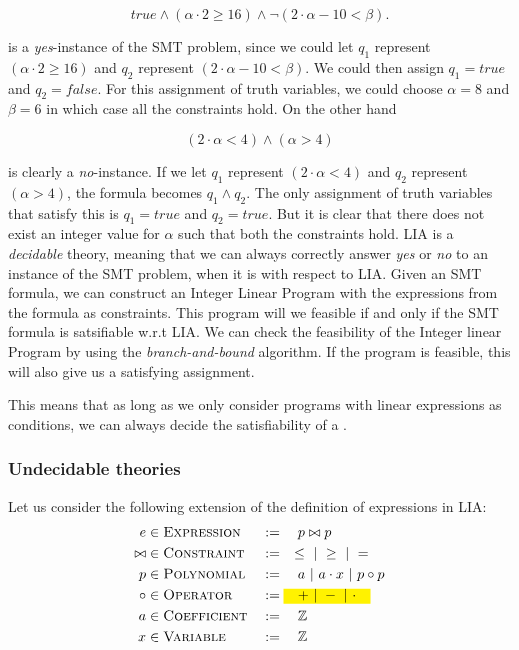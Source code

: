 	\begin{equation*}	
	true \land (\alpha \cdot 2 \geq 16) \land \neg (2\cdot \alpha - 10 < \beta).
	\end{equation*}

	is a \emph{yes}-instance of the SMT problem, since we could let $q_1$ represent $(\alpha \cdot 2 \geq 16)$ and $q_2$ represent $(2\cdot \alpha - 10 < \beta)$. We could then assign $q_1 = true$ and $q_2 = false$. For this assignment of truth variables, we could choose $\alpha = 8$ and $\beta = 6$ in which case all the constraints hold. On the other hand 
	
	\begin{equation*}
		(2\cdot \alpha < 4) \land (\alpha > 4)
	\end{equation*}
	
	is clearly a \emph{no}-instance. If we let $q_1$ represent $(2\cdot \alpha < 4)$ and $q_2$ represent $(\alpha > 4)$, the formula becomes $q_1\land q_2$. The only assignment of truth variables that satisfy this is $q_1 = true$ and $q_2 = true$. But it is clear that there does not exist an integer value for $\alpha$ such that both the constraints hold. LIA is a \emph{decidable} theory, meaning that we can always correctly answer \emph{yes} or \emph{no} to an instance of the SMT problem, when it is with respect to LIA. Given an SMT formula, we can construct an Integer Linear Program with the expressions from the formula as constraints. This program will we feasible if and only if the SMT formula is satsifiable w.r.t LIA. We can check the feasibility of the Integer linear Program by using the \emph{branch-and-bound} algorithm. If the program is feasible, this will also give us a satisfying assignment.
	
	This means that as long as we only consider programs with linear expressions as conditions, we can always decide the satisfiability of a \pc.
	
	\subsubsection{Undecidable theories}
	Let us consider the following extension of the definition of expressions in LIA:
	\begin{alignat*}{3}
		e & \in \textsc{Expression} && := \quad p \bowtie p\\
		\bowtie & \in \textsc{Constraint} && := \quad \leq \alt \geq \alt =\\
		p & \in \textsc{Polynomial} && := \quad a \alt a\cdot x \alt p \circ p\\
		\circ & \in \textsc{Operator} && := \text{\hl{$\quad + \alt - \alt \cdot \quad$}} \\
		a & \in \textsc{Coefficient} && := \quad \mathbb{Z}\\
		x & \in \textsc{Variable} && := \quad \mathbb{Z}
	\end{alignat*}
	
